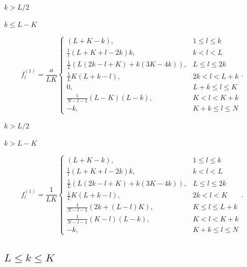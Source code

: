 \documentclass[specialist,
               substylefile = spbu.rtx,
               subf,href,colorlinks=true, 12pt]{disser}
\begin{document}
$k > L/2$

$k \leq L - K$

$$f^{(1)}_l = \frac{a}{{LK}}
\begin{cases}
	(L + K - k), & \text{$1 \leq l \leq k$}\\
	\frac{1}{l}(L + K + l - 2k)k, & \text{$k < l < L$}\\
	\frac{1}{L}(L(2k - l + K) + k(3K - 4k)), & \text{$L\leq l \leq 2k$}\\
	\frac{1}{L}K(L + k - l), &\text{$2k < l < L + k$}\\
	0, &\text{$L + k \leq l \leq K$}\\
	\frac{1}{N - l - 1}(L - K)(L - k), &\text{$K < l < K + k$}\\
	-k, &\text{$K + k \leq l \leq N$}
\end{cases}.
$$

$k > L/2$

$k > L - K$

$$f^{(1)}_l = \frac{1}{{LK}}
\begin{cases}
	(L + K - k), & \text{$1 \leq l \leq k$}\\
	\frac{1}{l}(L + K + l - 2k)k, & \text{$k < l < L$}\\
	\frac{1}{L}(L(2k - l + K) + k(3K - 4k)), & \text{$L \leq l \leq 2k$}\\
	\frac{1}{L}K(L + k - l), &\text{$2k < l < K$}\\
	\frac{1}{N - l - 1}(2k + (L - l)K), &\text{$K \leq l \leq L + k$}\\
	\frac{1}{N - l - 1}(K - l)(L - k), &\text{$K < l < K + k$}\\
	-k, &\text{$K + k \leq l \leq N $}
\end{cases}.
$$

\subsection{$L \leq k \leq K$}
\end{document}

